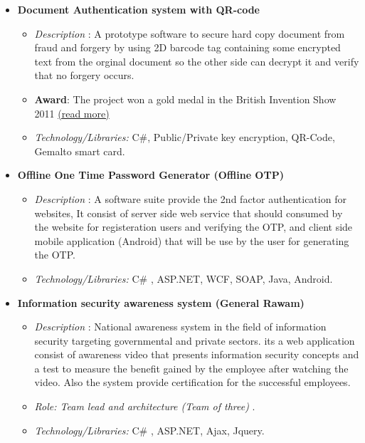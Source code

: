 \documentclass[11pt,a4paper]{moderncv}
\begin{document}
{\begin{itemize}
\begin{itemize}
\item  \textsl{Project size/Time:} 3 month project,  +5K Line of Code.
\end{itemize}
\item \textbf{Document Authentication system with QR-code}
\begin{itemize}
\item  \textsl{Description} : A prototype software to secure hard copy document from fraud and forgery by using 2D barcode tag containing some encrypted text from the orginal document so the other side can decrypt it and verify that no forgery occurs.
\item \textbf{Award}: The project won a gold medal in the British Invention Show 2011 \href{http://coeia.edu.sa/index.php/en/about-coeia/center-news/1689--gets-a-gold-medal-in-innovation-exhibition-in-britain.html}{(read more)}
\item  \textsl{Technology/Libraries:} C\#, Public/Private key encryption, QR-Code, Gemalto smart card.
\end{itemize}
\item \textbf{Offline One Time Password Generator (Offline OTP)}
\begin{itemize}
\item  \textsl{Description} : A software suite provide the 2nd factor authentication for websites, It consist of server side web service that should consumed by the website for registeration users and verifying the OTP, and client side mobile application (Android) that will be use by the user for generating the OTP. 
\item  \textsl{Technology/Libraries:} C\# , ASP.NET, WCF, SOAP, Java, Android. 
\end{itemize}
\item \textbf{Information security awareness system (General Rawam)}
\begin{itemize}
\item  \textsl{Description} : National awareness system in the field of information security targeting governmental and private sectors. its a web application consist of awareness video that presents information security concepts and a test to measure the benefit gained by the employee after watching the video. Also the system provide certification for the successful employees.
\item  \textsl{Role: Team lead and architecture (Team of three) }.
\item  \textsl{Technology/Libraries:} C\# , ASP.NET, Ajax, Jquery. 
\end{itemize}
\end{itemize}}
\end{document}
